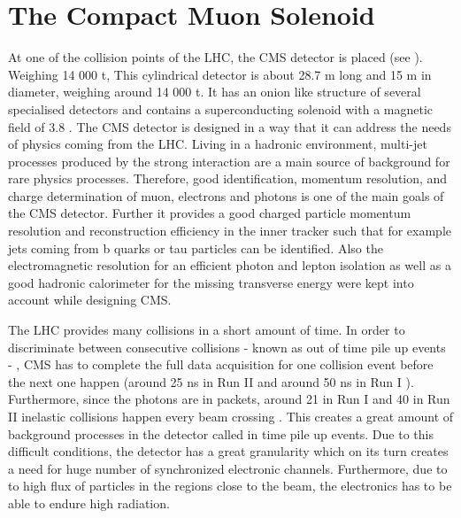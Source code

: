 \section{The Compact Muon Solenoid}
At one of the collision points of the LHC, the CMS detector\cite{CMS, Bayatian:2006zz,Bayatian:922757} is placed (see ). Weighing 14 000 \si{ \tonne}, This cylindrical detector is about 28.7 \si{ \meter} long and 15 \si{ \meter} in diameter, weighing around 14 000 \si{ \tonne}. It has an onion like structure of several specialised detectors and contains a superconducting solenoid with a magnetic field of 3.8 \si{ \Tesla}. The CMS detector is designed in a way that it can address the needs of physics coming from the LHC. Living in a hadronic environment, multi-jet processes produced by the strong interaction are a main source of background for rare physics processes. Therefore, good identification, momentum resolution, and charge determination of muon, electrons and photons is one of the main goals of the CMS detector. Further it provides a good charged particle momentum resolution and reconstruction efficiency in the inner tracker such that for example jets coming from b quarks or tau particles can be identified. Also the electromagnetic resolution for an efficient photon and lepton isolation as well as a good hadronic calorimeter for the missing transverse energy were kept into account while designing CMS. 

The LHC provides many collisions in a short amount of time. In order to discriminate between consecutive collisions - known as out of time pile up events - , CMS has to complete the full data acquisition for one collision event before the next one happen (around 25 \si{ \nano \second} in Run II and around 50 \si{ \nano \second} in Run I \cite{OLuanaigh:2051986}). Furthermore, since the photons are in packets, around 21 in Run I and 40 in Run II  inelastic collisions happen every beam crossing . This creates a great amount of background processes in the detector called in time pile up events. Due to this difficult conditions, the detector has a great granularity which on its turn creates a need for huge number of synchronized electronic channels. Furthermore, due to to high flux of particles in the regions close to the beam, the electronics has to be able to endure high radiation.


